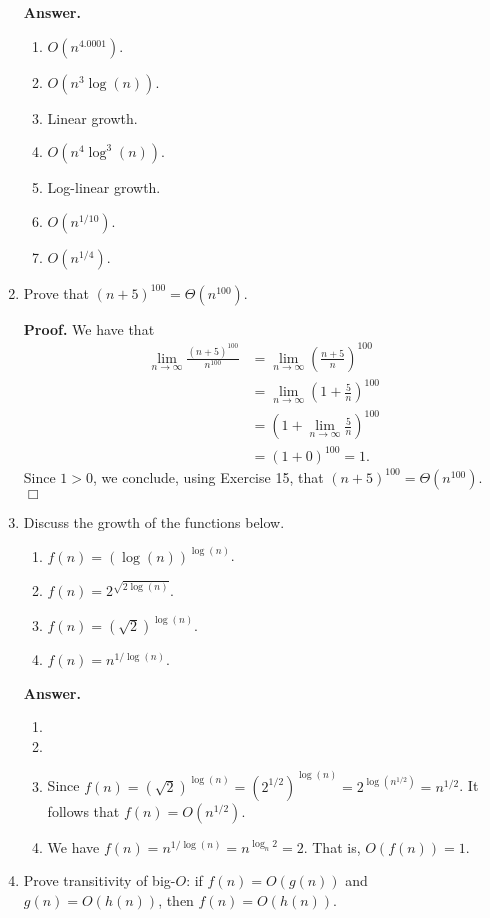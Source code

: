 \documentclass[9pt]{article}
\newcommand{\qed}{\hfill \ensuremath{\Box}}
\begin{document}
\begin{enumerate}
      \textbf{Answer.}

      \begin{enumerate}
         \item $O(n^{4.0001})$.
         \item $O(n^3\log(n))$.
         \item Linear growth.
         \item $O(n^4\log^3(n))$.
         \item Log-linear growth.
         \item $O(n^{1/10})$.
         \item $O(n^{1/4})$.
      \end{enumerate}
   \item Prove that $(n+5)^{100} = \Theta(n^{100})$.

      \textbf{Proof.} We have that
      \begin{align*}
         \lim_{n \rightarrow \infty}\frac{(n+5)^{100}}{n^{100}} &=
            \lim_{n \rightarrow \infty}\left(\frac{n+5}{n}\right)^{100} \\
            &= \lim_{n \rightarrow \infty}\left(1 + \frac{5}{n}\right)^{100} \\
            &= \left(1 + \lim_{n \rightarrow \infty}\frac{5}{n}\right)^{100} \\
            &= (1 + 0)^{100} = 1.
      \end{align*}
      Since $1 > 0$, we conclude, using Exercise 15, that
      $(n+5)^{100} = \Theta(n^{100})$. \qed
   \item Discuss the growth of the functions below.
         \begin{enumerate}
            \item $f(n) = (\log(n))^{\log(n)}$.
            \item $f(n) = 2^{\sqrt{2\log(n)}}$.
            \item $f(n) = (\sqrt{2})^{\log(n)}$.
            \item $f(n) = n^{1/\log(n)}$.
         \end{enumerate}

      \textbf{Answer.}

      \begin{enumerate}
         \item
         \item
         \item Since $f(n) = (\sqrt{2})^{\log(n)} = (2^{1/2})^{\log(n)} =
                       2^{\log(n^{1/2})} = n^{1/2}$. It follows that
               $f(n) = O(n^{1/2})$.
         \item We have $f(n) = n^{1/\log(n)} = n^{\log_n2} = 2$. That is,
               $O(f(n)) = 1$.
      \end{enumerate}
   \item Prove transitivity of big-$O$: if $f(n) = O(g(n))$ and
         $g(n) = O(h(n))$, then $f(n) = O(h(n))$.


\end{enumerate}
\end{document}
